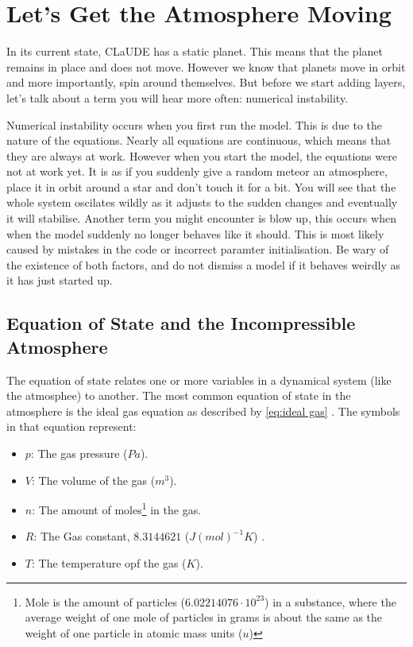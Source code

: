 \section{Let's Get the Atmosphere Moving}
In its current state, CLaUDE has a static planet. This means that the planet remains in place and does not move. However we know that planets move in orbit and more importantly, spin around 
themselves. But before we start adding layers, let's talk about a term you will hear more often: numerical instability.

Numerical instability occurs when you first run the model. This is due to the nature of the equations. Nearly all equations are continuous, which means that they are always at work. However 
when you start the model, the equations were not at work yet. It is as if you suddenly give a random meteor an atmosphere, place it in orbit around a star and don't touch it for a bit. You will 
see that the whole system oscilates wildly as it adjusts to the sudden changes and eventually it will stabilise. Another term you might encounter is blow up, this occurs when when the model 
suddenly no longer behaves like it should. This is most likely caused by mistakes in the code or incorrect paramter initialisation. Be wary of the existence of both factors, and do not dismiss 
a model if it behaves weirdly as it has just started up.

\subsection{Equation of State and the Incompressible Atmosphere}
The equation of state relates one or more variables in a dynamical system (like the atmosphee) to another. The most common equation of state in the atmosphere is the ideal gas equation as 
described by \autoref{eq:ideal gas} \cite{idealGas}. The symbols in that equation represent:

\begin{itemize}
    \item $p$: The gas pressure ($Pa$).
    \item $V$: The volume of the gas ($m^3$).
    \item $n$: The amount of moles\footnote{Mole is the amount of particles ($6.02214076 \cdot 10^{23}$) in a substance, where the average weight of one mole of particles in grams is about the 
    same as the weight of one particle in atomic mass units ($u$)\cite{mole}} in the gas.
    \item $R$: The Gas constant, $8.3144621$ ($J(mol)^{-1}K$) \cite{idealGas}.
    \item $T$: The temperature opf the gas ($K$).
\end{itemize}

